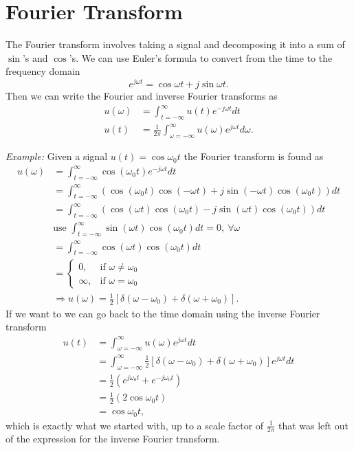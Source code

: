 \documentclass[lecture,12pt,]{pcms-l}
\newcommand{\tint}{\int_{t=-\infty}^\infty}
\newcommand{\fint}{\int_{\omega=-\infty}^\infty}
\newcommand{\w}{\omega}
\newcommand{\wo}{\omega_0}
\begin{document}
\section{Fourier Transform}
The Fourier transform involves taking a signal and decomposing it into a sum of $\sin$'s and $\cos$'s. We can use Euler's formula to convert from the time to the frequency domain
$$e^{j\w t} = \cos\w t + j\sin\w t.$$
Then we can write the Fourier and inverse Fourier transforms as
\begin{align*}
u(\w) &= \tint u(t)e^{-j\w t}dt \\
u(t) &= \frac{1}{2\pi} \fint u(\w)e^{j\w t}d\w.
\end{align*}

\textit{Example:} Given a signal $u(t)=\cos\wo t$ the Fourier transform is found as
\begin{align*}
u(\w) &= \tint \cos(\wo t)e^{-j\w t}dt \\
&= \tint \left(\cos(\wo t)\cos(-\w t) + j\sin(-\w t)\cos(\wo t)\right)dt \\
&= \tint \left(\cos(\w t)\cos(\wo t) - j\sin(\w t)\cos(\wo t)\right)dt \\
&\text{use }\tint \sin(\w t)\cos(\wo t)dt = 0, ~ \forall \w \\
&= \tint \cos(\w t)\cos(\wo t)dt \\
&= \begin{cases} 0, & \text{if } \w \neq \wo \\ \infty, & \text{if } \w = \wo \end{cases} \\
&\Rightarrow u(\w) = \frac{1}{2} \left[\delta(\w-\wo) + \delta(\w+\wo)\right].
\end{align*}
If we want to we can go back to the time domain using the inverse Fourier transform
\begin{align*}
u(t) &= \fint u(\w)e^{j\w t}dt \\
&= \fint \frac{1}{2} \left[\delta(\w-\wo) + \delta(\w+\wo)\right] e^{j\w t}dt \\
&= \frac{1}{2}\left(e^{j\wo t} + e^{-j\wo t}\right) \\
&= \frac{1}{2}\left(2\cos\wo t\right) \\
&= \cos\wo t,
\end{align*}
which is exactly what we started with, up to a scale factor of $\frac{1}{2\pi}$ that was left out of the expression for the inverse Fourier transform.
\end{document}
